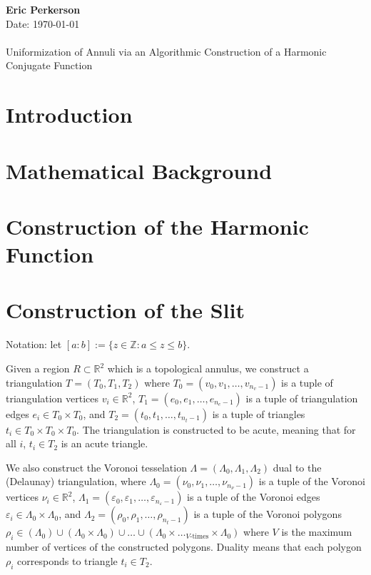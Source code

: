 \documentclass{article}
\newcommand{\solutions}[5]{
	\begin{center}
	{
		\small  #1 #2
		\hfill {\Large \bf {Eric Perkerson} }\\ \vspace{.5pt}
		#3 \hfill
		{
			 Date: #5
		}
	} \\
	\vspace{-1ex}
	\hrulefill\\
	\vspace{4ex}
	{
		\LARGE Uniformization of Annuli via an Algorithmic Construction of a Harmonic Conjugate Function
	} \\
	\vspace{20pt}
	\end{center}
}
\begin{document}
\solutions{}{}{}{1}{\today}

\section{Introduction}

\section{Mathematical Background}

\section{Construction of the Harmonic Function}

\section{Construction of the Slit}

Notation: let $[a : b] := \{ z \in \mathbb{Z} \colon a \le z \le b \}$.

Given a region $R \subset \mathbb{R}^2$ which is a topological annulus, we construct a triangulation $T = (T_0, T_1, T_2)$ where $T_0 = (v_0, v_1, \dots, v_{n_v - 1})$ is a tuple of triangulation vertices $v_i \in \mathbb{R}^2$, $T_1 = (e_0, e_1, \dots, e_{n_e - 1})$ is a tuple of triangulation edges $e_i \in T_0 \times T_0$, and $T_2 = (t_0, t_1, \dots, t_{n_t - 1})$ is a tuple of triangles $t_i \in T_0 \times T_0 \times T_0$. The triangulation is constructed to be acute, meaning that for all $i$, $t_i \in T_2$ is an acute triangle.

We also construct the Voronoi tesselation $\Lambda = (\Lambda_0, \Lambda_1, \Lambda_2)$ dual to the (Delaunay) triangulation, where $\Lambda_0 = (\nu_0, \nu_1, \dots, \nu_{n_\nu - 1})$ is a tuple of the Voronoi vertices $\nu_i \in \mathbb{R}^2$, $\Lambda_1 = (\varepsilon_0, \varepsilon_1, \dots, \varepsilon_{n_\varepsilon - 1})$ is a tuple of the Voronoi edges $\varepsilon_i \in \Lambda_0 \times \Lambda_0$, and $\Lambda_2 = (\rho_0, \rho_1, \dots, \rho_{n_t - 1})$ is a tuple of the Voronoi polygons $\rho_i \in (\Lambda_0) \cup (\Lambda_0 \times \Lambda_0) \cup \dots \cup (\Lambda_0 \times \dots_{V\text{-times}} \times \Lambda_0)$ where $V$ is the maximum number of vertices of the constructed polygons. Duality means that each polygon $\rho_i$ corresponds to triangle $t_i \in T_2$.
\end{document}
